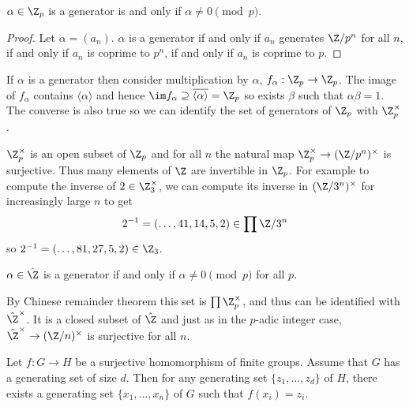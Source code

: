 \documentclass[a4paper]{article}
\begin{document}
\begin{proposition}
  \(\alpha \in \Z_p\) is a generator is and only if \(\alpha \ne 0 \pmod p\).
\end{proposition}

\begin{proof}
  Let \(\alpha = (a_n)\). \(\alpha\) is a generator if and only if \(a_n\) generates \(\Z/p^n\) for all \(n\), if and only if \(a_n\) is coprime to \(p^n\), if and only if \(a_n\) is coprime to \(p\).
\end{proof}

If \(\alpha\) is a generator then consider multiplication by \(\alpha\), \(f_\alpha: \Z_p \to \Z_p\). The image of \(f_\alpha\) contains \(\langle\alpha\rangle\) and hence \(\im f_\alpha \supseteq \overline{\langle \alpha\rangle} = \Z_p\) so exists \(\beta\) such that \(\alpha\beta = 1\). The converse is also true so we can identify the set of generators of \(\Z_p\) with \(\Z_p^\times\).

\(\Z_p^\times\) is an open subset of \(\Z_p\) and for all \(n\) the natural map \(\Z_p^\times \to (\Z/p^n)^\times\) is surjective. Thus many elements of \(\Z\) are invertible in \(\Z_p\). For example to compute the inverse of \(2 \in \Z_3^\times\), we can compute its inverse in \((\Z/3^n)^\times\) for increasingly large \(n\) to get
\[
  2^{-1} = (\dots, 41, 14, 5, 2) \in \prod \Z/3^n
\]
so \(2^{-1} = (\dots, 81, 27, 5, 2) \in \Z_3\).

\begin{proposition}
  \(\alpha \in \hat \Z\) is a generator if and only if \(\alpha \ne 0 \pmod p\) for all \(p\).
\end{proposition}

By Chinese remainder theorem this set is \(\prod \Z_p^\times\), and thus can be identified with \(\hat \Z^\times\). It is a closed subset of \(\hat \Z\) and just as in the \(p\)-adic integer case, \(\hat \Z^\times \to (\Z/n)^\times\) is surjective for all \(n\).

\begin{theorem}
  Let \(f: G \to H\) be a surjective homomorphism of finite groups. Assume that \(G\) has a generating set of size \(d\). Then for any generating set \(\{z_1, \dots, z_d\}\) of \(H\), there exists a generating set \(\{x_1, \dots, x_n\}\) of \(G\) such that \(f(x_i) = z_i\).
\end{theorem}
\end{document}
